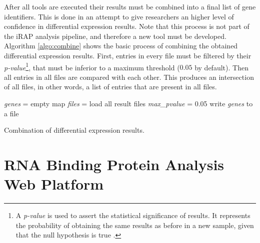 After all tools are executed their results must be combined into a final list of
gene identifiers. This is done in an attempt to give researchers an higher level
of confidence in differential expression results. Note that this process is not
part of the iRAP analysis pipeline, and therefore a new tool must be developed.
Algorithm \ref{algo:combine} shows the basic process of combining the obtained
differential expression results. First, entries in every file must be filtered
by their \emph{p-value}\footnote{A \emph{p-value} is used to assert the
statistical significance of results. It represents the probability of obtaining
the same results as before in a new sample, given that the null hypothesis is
true \cite{goodman45dirty}.}, that must be inferior to a maximum threshold
($0.05$ by default). Then all entries in all files are compared with each other.
This produces an intersection of all files, in other words, a list of entries
that are present in all files.

\begin{algorithm}
  \emph{genes} = empty map\;
  \emph{files} = load all result files\;
  \emph{max\_pvalue} = 0.05\;
  write \emph{genes} to a file\;
  \BlankLine

  \caption[Combination of differential expression results]{
    Combination of differential expression results.
  }
  \label{algo:combine}
\end{algorithm}

\section{RNA Binding Protein Analysis Web Platform}


